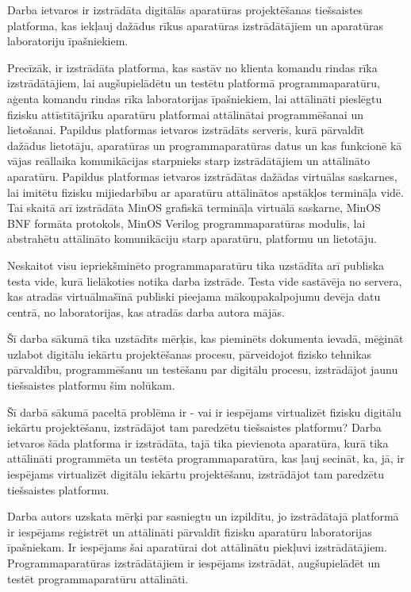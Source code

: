Darba ietvaros ir izstrādāta digitālās aparatūras projektēšanas tiešsaistes
platforma, kas iekļauj dažādus rīkus aparatūras izstrādātājiem un aparatūras
laboratoriju īpašniekiem.

Precīzāk, ir izstrādāta platforma, kas sastāv no klienta komandu rindas rīka
izstrādātājiem, lai augšupielādētu un testētu platformā programmaparatūru,
aģenta komandu rindas rīka laboratorijas īpašniekiem, lai attālināti pieslēgtu
fizisku attīstītājrīku aparatūru platformai attālinātai programmēšanai un
lietošanai. Papildus platformas ietvaros izstrādāts serveris, kurā pārvaldīt
dažādus lietotāju, aparatūras un programmaparatūras datus un kas funkcionē kā
vājas reāllaika komunikācijas starpnieks starp izstrādātājiem un attālināto
aparatūru. Papildus platformas ietvaros izstrādātas dažādas virtuālas saskarnes,
lai imitētu fizisku mijiedarbību ar aparatūru attālinātos apstākļos termināļa
vidē. Tai skaitā arī izstrādāta MinOS grafiskā termināļa virtuālā saskarne,
MinOS BNF formāta protokols, MinOS Verilog programmaparatūras modulis, lai
abstrahētu attālināto komunikāciju starp aparatūru, platformu un lietotāju.
\cite{VeinbahsKrisjanisTestbed}

Neskaitot visu iepriekšminēto programmaparatūru tika uzstādīta arī publiska
testa vide, kurā lielākoties notika darba izstrāde. Testa vide sastāvēja no
servera, kas atradās virtuālmašīnā publiski pieejama mākoņpakalpojumu devēja
datu centrā, no laboratorijas, kas atradās darba autora mājās.
\cite{VeinbahsKrisjanisProduction}

Šī darba sākumā tika uzstādīts mērķis, kas pieminēts dokumenta ievadā, mēģināt
uzlabot digitālu iekārtu projektēšanas procesu, pārveidojot fizisko tehnikas
pārvaldību, programmēšanu un testēšanu par digitālu procesu, izstrādājot jaunu
tiešsaistes platformu šim nolūkam.

Šī darbā sākumā paceltā problēma ir - vai ir iespējams virtualizēt fizisku
digitālu iekārtu projektēšanu, izstrādājot tam paredzētu tiešsaistes platformu?
Darba ietvaros šāda platforma ir izstrādāta, tajā tika pievienota aparatūra,
kurā tika attālināti programmēta un testēta programmaparatūra, kas ļauj secināt,
ka, jā, ir iespējams virtualizēt digitālu iekārtu projektēšanu, izstrādājot tam
paredzētu tiešsaistes platformu.

Darba autors uzskata mērķi par sasniegtu un izpildītu, jo izstrādātajā platformā
ir iespējams reģistrēt un attālināti pārvaldīt fizisku aparatūru laboratorijas
īpašniekam. Ir iespējams šai aparatūrai dot attālinātu piekļuvi izstrādātājiem.
Programmaparatūras izstrādātājiem ir iespējams izstrādāt, augšupielādēt un
testēt programmaparatūru attālināti. 

